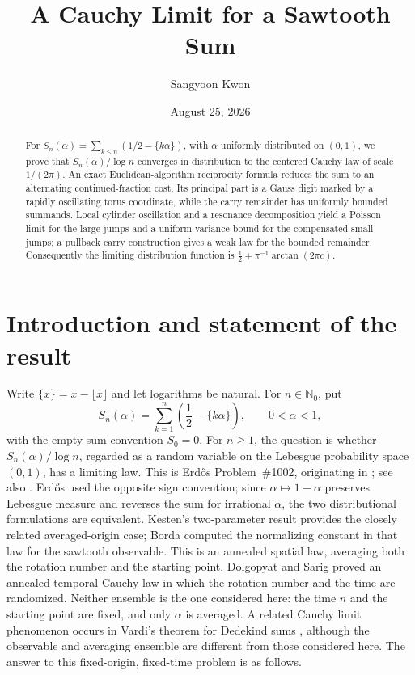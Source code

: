 \documentclass[11pt,a4paper]{amsart}
\title{A Cauchy Limit for a Sawtooth Sum}
\author{Sangyoon Kwon}
\date{August 25, 2026}
\theoremstyle{definition}
\theoremstyle{remark}
\newcommand{\N}{\mathbb N}
\begin{document}
\begin{abstract}
For $S_n(\alpha)=\sum_{k\le n}(1/2-\{k\alpha\})$, with $\alpha$ uniformly distributed on $(0,1)$, we prove that $S_n(\alpha)/\log n$ converges in distribution to the centered Cauchy law of scale $1/(2\pi)$.  An exact Euclidean-algorithm reciprocity formula reduces the sum to an alternating continued-fraction cost.  Its principal part is a Gauss digit marked by a rapidly oscillating torus coordinate, while the carry remainder has uniformly bounded summands.  Local cylinder oscillation and a resonance decomposition yield a Poisson limit for the large jumps and a uniform variance bound for the compensated small jumps; a pullback carry construction gives a weak law for the bounded remainder.  Consequently the limiting distribution function is $\frac12+\pi^{-1}\arctan(2\pi c)$.
\end{abstract}

\maketitle

\section{Introduction and statement of the result}

Write $\{x\}=x-\lfloor x\rfloor$ and let logarithms be natural.  For
$n\in\N_0$, put
\[
 S_n(\alpha)=\sum_{k=1}^{n}\left(\frac12-\{k\alpha\}\right),
 \qquad 0<\alpha<1,
\]
with the empty-sum convention $S_0=0$.  For $n\ge1$, the question is whether
$S_n(\alpha)/\log n$, regarded as a random variable on
the Lebesgue probability space $(0,1)$, has a limiting law.  This is
Erd\H{o}s Problem~\#1002, originating in \cite{Er64b}; see also
\cite{Bloom1002}.  Erd\H{o}s used the opposite sign convention; since
$\alpha\mapsto1-\alpha$ preserves Lebesgue measure and reverses the
sum for irrational $\alpha$, the two distributional formulations are
equivalent.  Kesten's two-parameter result \cite{Ke60} provides the
closely related averaged-origin case; Borda \cite{Borda25} computed the
normalizing constant in that law for the sawtooth observable.  This is an
annealed spatial law, averaging both the rotation number and the starting
point.  Dolgopyat and Sarig \cite{DS20} proved an annealed temporal Cauchy
law in which the rotation number and the time are randomized.  Neither
ensemble is the one considered here: the time $n$ and the starting point are
fixed, and only $\alpha$ is averaged.  A related Cauchy limit phenomenon
occurs in Vardi's theorem for Dedekind sums \cite{Vardi93}, although the
observable and averaging ensemble are different from those considered here.
The answer to this
fixed-origin, fixed-time problem is as follows.
\end{document}
